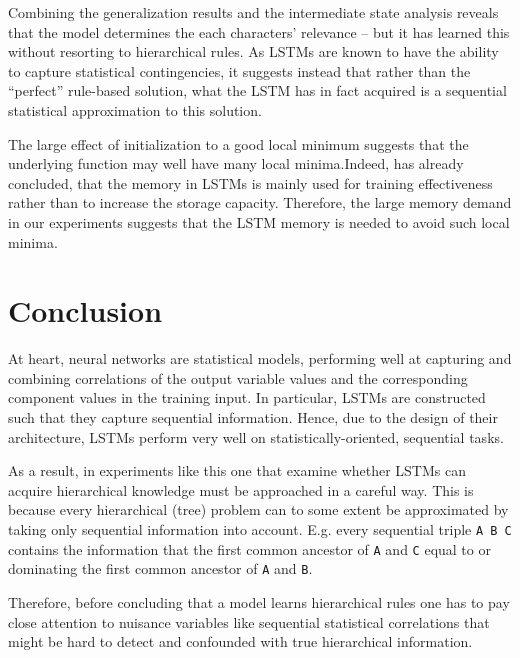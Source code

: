 \documentclass[11pt,a4paper]{article}
\begin{document}
Combining the generalization results and the intermediate state analysis reveals that the model determines the each characters' relevance -- but it has learned this without resorting to hierarchical rules. As LSTMs are known to have the ability to capture statistical contingencies, it suggests instead that rather than the ``perfect'' rule-based solution, what the LSTM has in fact acquired is a sequential statistical approximation to this solution.

The large effect of initialization to a good local minimum suggests that the underlying function may well have many local minima.Indeed, \citeauthor{collins2016capacity}  has already concluded, that the memory in LSTMs is mainly used for training effectiveness rather than to increase the storage capacity. Therefore, the large memory demand in our experiments suggests that the LSTM memory is needed to avoid such local minima.

\section{Conclusion}

At heart, neural networks are statistical models, performing well at capturing and combining correlations of the output variable values and the corresponding component values in the training input. In particular, LSTMs are constructed such that they capture sequential information. Hence, due to the design of their architecture, LSTMs perform very well on statistically-oriented, sequential tasks. 

As a result, in experiments like this one that examine whether LSTMs can acquire hierarchical knowledge must be approached in a careful way.  This is because every hierarchical (tree) problem can to some extent be approximated by taking only sequential information into account. E.g. every sequential triple \verb|A B C| contains the information that the first common ancestor of \verb|A| and \verb|C| equal to or dominating the first common ancestor of \verb|A| and \verb|B|.

Therefore, before concluding that a model learns hierarchical rules one has to pay close attention to nuisance variables like sequential statistical correlations that might be hard to detect and confounded with true hierarchical information.
\end{document}
